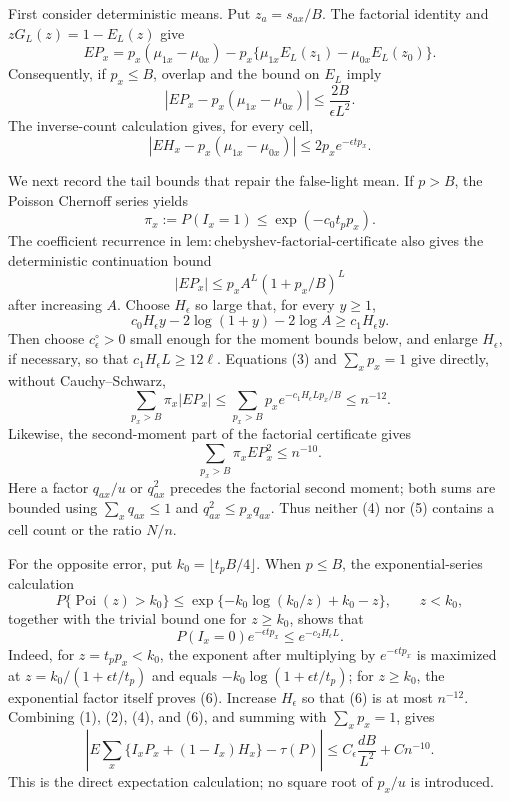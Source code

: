 First consider deterministic means.  Put \(z_a=s_{ax}/B\).  The factorial identity and \(zG_L(z)=1-E_L(z)\) give
\[
 E P_x=p_x(\mu_{1x}-\mu_{0x})
 -p_x\{\mu_{1x}E_L(z_1)-\mu_{0x}E_L(z_0)\}.
\]
Consequently, if \(p_x\le B\), overlap and the bound on \(E_L\) imply
\[
 |EP_x-p_x(\mu_{1x}-\mu_{0x})|\le \frac{2B}{\epsilon L^2}. \tag{1}
\]
The inverse-count calculation gives, for every cell,
\[
 |EH_x-p_x(\mu_{1x}-\mu_{0x})|\le2p_xe^{-\epsilon t p_x}. \tag{2}
\]

We next record the tail bounds that repair the false-light mean.  If \(p>B\), the Poisson Chernoff series yields
\[
 \pi_x:=P(I_x=1)\le \exp(-c_0t_pp_x).
\]
The coefficient recurrence in \(\mathrm{lem:chebyshev\mbox{-}factorial\mbox{-}certificate}\) also gives the deterministic continuation bound
\[
 |EP_x|\le p_xA^L(1+p_x/B)^L
\]
after increasing \(A\).  Choose \(H_\epsilon\) so large that, for every \(y\ge1\),
\[
 c_0H_\epsilon y-2\log(1+y)-2\log A\ge c_1H_\epsilon y. \tag{3}
\]
Then choose \(c_\epsilon^\circ>0\) small enough for the moment bounds below, and enlarge \(H_\epsilon\), if necessary, so that \(c_1H_\epsilon L\ge12\ell\).  Equations (3) and \(\sum_xp_x=1\) give directly, without Cauchy--Schwarz,
\[
 \sum_{p_x>B}\pi_x|EP_x|
 \le \sum_{p_x>B}p_xe^{-c_1H_\epsilon Lp_x/B}\le n^{-12}. \tag{4}
\]
Likewise, the second-moment part of the factorial certificate gives
\[
 \sum_{p_x>B}\pi_xEP_x^2\le n^{-10}. \tag{5}
\]
Here a factor \(q_{ax}/u\) or \(q_{ax}^2\) precedes the factorial second moment; both sums are bounded using \(\sum_xq_{ax}\le1\) and \(q_{ax}^2\le p_xq_{ax}\).  Thus neither (4) nor (5) contains a cell count or the ratio \(N/n\).

For the opposite error, put \(k_0=\lfloor t_pB/4\rfloor\).  When \(p\le B\), the exponential-series calculation
\[
 P\{\operatorname{Poi}(z)>k_0\}\le
 \exp\{-k_0\log(k_0/z)+k_0-z\},\qquad z<k_0,
\]
together with the trivial bound one for \(z\ge k_0\), shows that
\[
 P(I_x=0)e^{-\epsilon t p_x}\le e^{-c_2H_\epsilon L}. \tag{6}
\]
Indeed, for \(z=t_pp_x<k_0\), the exponent after multiplying by \(e^{-\epsilon tp_x}\) is maximized at \(z=k_0/(1+\epsilon t/t_p)\) and equals \(-k_0\log(1+\epsilon t/t_p)\); for \(z\ge k_0\), the exponential factor itself proves (6).  Increase \(H_\epsilon\) so that (6) is at most \(n^{-12}\).  Combining (1), (2), (4), and (6), and summing with \(\sum_xp_x=1\), gives
\[
 |E\sum_x\{I_xP_x+(1-I_x)H_x\}-\tau(P)|
 \le C_\epsilon\frac{dB}{L^2}+Cn^{-10}. \tag{7}
\]
This is the direct expectation calculation; no square root of \(p_x/u\) is introduced.

